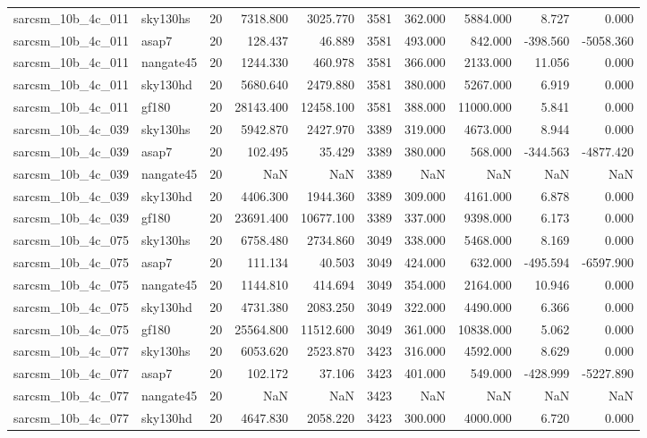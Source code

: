 \begin{tabular}{llrrrrrrrr}
sarcsm\_10b\_4c\_011 & sky130hs & 20 & 7318.800 & 3025.770 & 3581 & 362.000 & 5884.000 & 8.727 & 0.000 \\
sarcsm\_10b\_4c\_011 & asap7 & 20 & 128.437 & 46.889 & 3581 & 493.000 & 842.000 & -398.560 & -5058.360 \\
sarcsm\_10b\_4c\_011 & nangate45 & 20 & 1244.330 & 460.978 & 3581 & 366.000 & 2133.000 & 11.056 & 0.000 \\
sarcsm\_10b\_4c\_011 & sky130hd & 20 & 5680.640 & 2479.880 & 3581 & 380.000 & 5267.000 & 6.919 & 0.000 \\
sarcsm\_10b\_4c\_011 & gf180 & 20 & 28143.400 & 12458.100 & 3581 & 388.000 & 11000.000 & 5.841 & 0.000 \\
sarcsm\_10b\_4c\_039 & sky130hs & 20 & 5942.870 & 2427.970 & 3389 & 319.000 & 4673.000 & 8.944 & 0.000 \\
sarcsm\_10b\_4c\_039 & asap7 & 20 & 102.495 & 35.429 & 3389 & 380.000 & 568.000 & -344.563 & -4877.420 \\
sarcsm\_10b\_4c\_039 & nangate45 & 20 & NaN & NaN & 3389 & NaN & NaN & NaN & NaN \\
sarcsm\_10b\_4c\_039 & sky130hd & 20 & 4406.300 & 1944.360 & 3389 & 309.000 & 4161.000 & 6.878 & 0.000 \\
sarcsm\_10b\_4c\_039 & gf180 & 20 & 23691.400 & 10677.100 & 3389 & 337.000 & 9398.000 & 6.173 & 0.000 \\
sarcsm\_10b\_4c\_075 & sky130hs & 20 & 6758.480 & 2734.860 & 3049 & 338.000 & 5468.000 & 8.169 & 0.000 \\
sarcsm\_10b\_4c\_075 & asap7 & 20 & 111.134 & 40.503 & 3049 & 424.000 & 632.000 & -495.594 & -6597.900 \\
sarcsm\_10b\_4c\_075 & nangate45 & 20 & 1144.810 & 414.694 & 3049 & 354.000 & 2164.000 & 10.946 & 0.000 \\
sarcsm\_10b\_4c\_075 & sky130hd & 20 & 4731.380 & 2083.250 & 3049 & 322.000 & 4490.000 & 6.366 & 0.000 \\
sarcsm\_10b\_4c\_075 & gf180 & 20 & 25564.800 & 11512.600 & 3049 & 361.000 & 10838.000 & 5.062 & 0.000 \\
sarcsm\_10b\_4c\_077 & sky130hs & 20 & 6053.620 & 2523.870 & 3423 & 316.000 & 4592.000 & 8.629 & 0.000 \\
sarcsm\_10b\_4c\_077 & asap7 & 20 & 102.172 & 37.106 & 3423 & 401.000 & 549.000 & -428.999 & -5227.890 \\
sarcsm\_10b\_4c\_077 & nangate45 & 20 & NaN & NaN & 3423 & NaN & NaN & NaN & NaN \\
sarcsm\_10b\_4c\_077 & sky130hd & 20 & 4647.830 & 2058.220 & 3423 & 300.000 & 4000.000 & 6.720 & 0.000 \\

\end{tabular}
